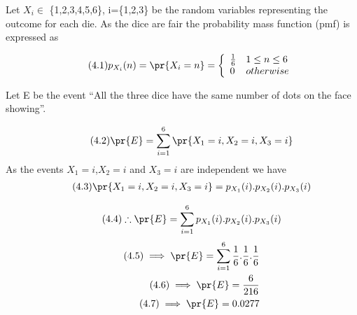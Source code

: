 Let $X_{i} \in$ \{1,2,3,4,5,6\}, i=\{1,2,3\} be the random variables representing the outcome for each die. As the dice are fair the probability mass function (pmf) is expressed as 

\begin{align}
\tag{4.1}
    p_{X_{i}}(n)=\pr{X_{i}=n} =    \left\{
    \begin{array}{ll}
      \frac{1}{6} & 1\leq n\leq 6 \\
      0 & otherwise \\
    \end{array} 
    \right. 
\end{align}

Let E be the event ``All the three dice have the same number of dots on the face showing''.



\begin{align}
    \tag{4.2}
    \pr{E} = \sum_{i=1}^{6}\pr{X_{1}=i,X_{2}=i,X_{3}=i}
\end{align}
As the events $X_{1}=i$,$X_{2}=i$ and $X_{3}=i$ are independent we have
\begin{align}
    \tag{4.3}
    \pr{X_{1}=i,X_{2}=i,X_{3}=i}=p_{X_{1}}(i).p_{X_{2}}(i).p_{X_{3}}(i)
\end{align}
    
\begin{align}
    \tag{4.4}
    \therefore \pr{E} = \sum_{i=1}^{6}p_{X_{1}}(i).p_{X_{2}}(i).p_{X_{3}}(i)
\end{align}
\begin{align}
    \tag{4.5}
    \implies \pr{E} = \sum_{i=1}^{6}\frac{1}{6}.\frac{1}{6}.\frac{1}{6}\\
    \tag{4.6}
    \implies \pr{E} = \frac{6}{216}\\
    \tag{4.7}
    \implies \pr{E} = 0.0277
\end{align}